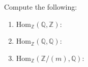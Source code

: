 \begin{problem}
    Compute the following:

    \begin{enumerate}[label=(\theproblem.\arabic*),ref=\theproblem.\arabic*]
        \item $\text{Hom}_{\mathbb{Z}}(\mathbb{Q}, \mathbb{Z})$:
        \item $\text{Hom}_{\mathbb{Z}}(\mathbb{Q}, \mathbb{Q})$:
        \item $\text{Hom}_{\mathbb{Z}}(\mathbb{Z}/(m), \mathbb{Q})$:

    \end{enumerate}
\end{problem}